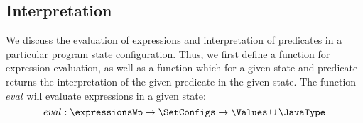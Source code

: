 

\newtheorem{interpExpr}{Definition}[subsection]
\newtheorem{interpTypeExpr}[interpExpr]{Definition} 
\newtheorem{interpPred}[interpExpr]{Definition}
\newtheorem{valid}[interpExpr]{Definition}

\subsection{Interpretation }\label{interpret}

We discuss the evaluation of expressions and interpretation of predicates  in a particular program state configuration.
Thus, we first define a function for expression evaluation, as well as a function which for a given state and predicate returns the interpretation
of the given predicate in the given state. 
The function $eval$ will evaluate expressions in a given state:
$$
eval : \expressionsWp \rightarrow \SetConfigs \rightarrow \Values \cup \JavaType
$$





